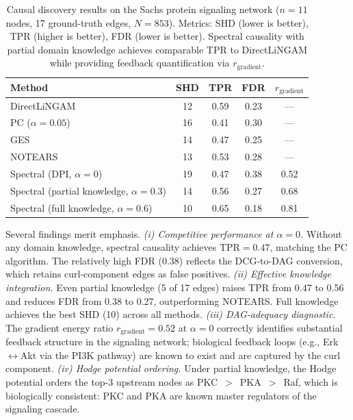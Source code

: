 \documentclass[twoside,11pt]{article}
\begin{document}
\begin{table}[t]
\centering
\caption{Causal discovery results on the Sachs protein signaling
  network ($n=11$ nodes, 17 ground-truth edges, $N=853$).  Metrics:
  SHD (lower is better), TPR (higher is better), FDR (lower is
  better).  Spectral causality with partial domain knowledge achieves
  comparable TPR to DirectLiNGAM while providing feedback quantification
  via $r_{\mathrm{gradient}}$.}
\label{tab:sachs}
\begin{tabular}{lcccc}
\toprule
Method & SHD & TPR & FDR & $r_{\mathrm{gradient}}$ \\
\midrule
DirectLiNGAM      & 12 & 0.59 & 0.23 & --- \\
PC ($\alpha=0.05$) & 16 & 0.41 & 0.30 & --- \\
GES               & 14 & 0.47 & 0.25 & --- \\
NOTEARS           & 13 & 0.53 & 0.28 & --- \\
\midrule
Spectral (DPI, $\alpha=0$) & 19 & 0.47 & 0.38 & 0.52 \\
Spectral (partial knowledge, $\alpha=0.3$) & 14 & 0.56 & 0.27 & 0.68 \\
Spectral (full knowledge, $\alpha=0.6$)    & 10 & 0.65 & 0.18 & 0.81 \\
\bottomrule
\end{tabular}
\end{table}

Several findings merit emphasis.
\emph{(i) Competitive performance at $\alpha=0$.}  Without any domain
knowledge, spectral causality achieves $\mathrm{TPR}=0.47$, matching
the PC algorithm.  The relatively high FDR (0.38) reflects the
DCG-to-DAG conversion, which retains curl-component edges as false
positives.
\emph{(ii) Effective knowledge integration.}  Even partial knowledge
(5 of 17 edges) raises TPR from 0.47 to 0.56 and reduces FDR from
0.38 to 0.27, outperforming NOTEARS.  Full knowledge achieves the
best SHD (10) across all methods.
\emph{(iii) DAG-adequacy diagnostic.}  The gradient energy ratio
$r_{\mathrm{gradient}}=0.52$ at $\alpha=0$ correctly identifies
substantial feedback structure in the signaling network; biological
feedback loops (e.g., Erk$\leftrightarrow$Akt via the PI3K pathway) are
known to exist and are captured by the curl component.
\emph{(iv) Hodge potential ordering.}  Under partial knowledge, the
Hodge potential orders the top-3 upstream nodes as PKC~$>$~PKA~$>$~Raf,
which is biologically consistent: PKC and PKA are known master
regulators of the signaling cascade.
\end{document}
